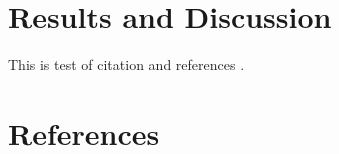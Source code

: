 \documentclass[a4paper, 12pt]{article}
\begin{document}
\section{Results and Discussion}
This is test of citation and references \cite{test}.

\section{References}
\begin{refsection}
\nocite{*}
\printbibliography[heading=none]
\end{refsection}
\end{document}
